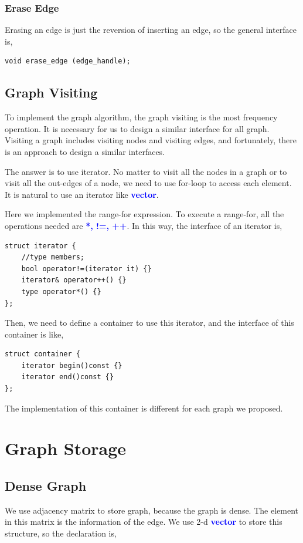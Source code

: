 \documentclass[]{article}
\begin{document}
\subsubsection {Erase Edge}
Erasing an edge is just the reversion of inserting an edge, so the general interface is,
\begin{lstlisting}
void erase_edge (edge_handle);
\end{lstlisting}
\subsection{Graph Visiting}
To implement the graph algorithm, the graph visiting is the most frequency operation. It is necessary for us to design a similar interface for all graph. Visiting a graph includes visiting nodes and visiting edges, and fortunately, there is an approach to design a similar interfaces. 

The answer is to use iterator. No matter to visit all the nodes in a graph or to visit all the out-edges of a node, we need to use for-loop to access each element. It is natural to use an iterator like \textbf{\textcolor{blue}{vector}}.

Here we implemented the range-for expression. To execute a range-for, all the operations needed are \textbf{\textcolor{blue}{*, !=, ++}}.  In this way, the interface of an iterator is,
\begin{lstlisting}
struct iterator {
	//type members;
	bool operator!=(iterator it) {}
	iterator& operator++() {}
	type operator*() {}
};
\end{lstlisting}
Then, we need to define a container to use this iterator, and the interface of this container is like,
\begin{lstlisting}
struct container {
	iterator begin()const {}
	iterator end()const {}
};

\end{lstlisting}

The implementation of this container is different for each graph we proposed.
\section{Graph Storage}
\subsection{Dense Graph}
We use adjacency matrix to store graph, because the graph is dense. The element in this matrix is the information of the edge. We use 2-d \textbf{\textcolor{blue}{vector}} to store this structure, so the declaration is,
\end{document}
